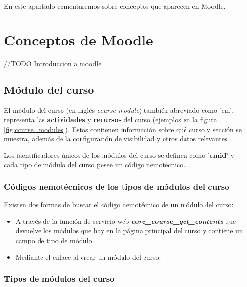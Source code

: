 
En este apartado comentaremos sobre conceptos que aparecen en Moodle.



\section{Conceptos de Moodle}

//TODO Introduccion a moodle

\subsection{Módulo del curso}
El módulo del curso\cite{noauthor_course_nodate} (en inglés \textit{course module}) también abreviado como `cm', representa las \textbf{actividades} y \textbf{recursos} del curso (ejemplos en la figura \ref{fig:course_modules}). Estos contienen información sobre qué curso y sección se muestra, además de la configuración de visibilidad y otros datos relevantes. 


Los identificadores únicos de los módulos del curso se definen como \textbf{`cmid'} y cada tipo de módulo del curso posee un código nemotécnico.


\subsubsection{Códigos nemotécnicos de los tipos de módulos del curso}

Existen dos formas de buscar el código nemotécnico de un módulo del curso:
\begin{itemize}
	\item A través de la función de servicio web \textbf{\textit{core\_course\_get\_contents}} que devuelve los módulos que hay en la página principal del curso y contiene un campo de tipo de módulo.
	
	\item Mediante el enlace al crear un módulo del curso.
	
\end{itemize}

\subsubsection{Tipos de módulos del curso}

